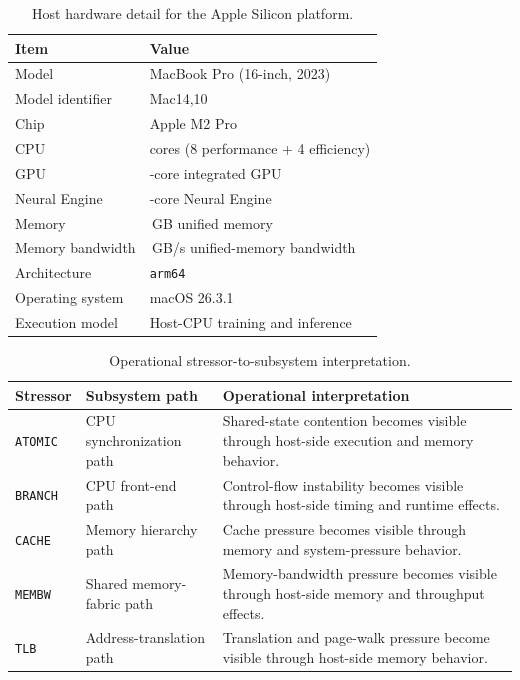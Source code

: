 \begin{table}[!t]
\centering
\caption{Host hardware detail for the Apple Silicon platform.}
\label{tab:app_host_hw}
{\scriptsize
\setlength{\tabcolsep}{2.6pt}
\renewcommand{\arraystretch}{1.02}
\begin{tabularx}{\columnwidth}{@{}l >{\raggedright\arraybackslash}X@{}}
\toprule
Item & Value \\
\midrule
Model & MacBook Pro (16-inch, 2023) \\
Model identifier & Mac14,10 \\
Chip & Apple M2 Pro \\
CPU & 12 cores (8 performance + 4 efficiency) \\
GPU & 19-core integrated GPU \\
Neural Engine & 16-core Neural Engine \\
Memory & 16\,GB unified memory \\
Memory bandwidth & 200\,GB/s unified-memory bandwidth \\
Architecture & \texttt{arm64} \\
Operating system & macOS 26.3.1 \\
Execution model & Host-CPU training and inference \\
\bottomrule
\end{tabularx}
}
\end{table}

\begin{table}[!t]
\centering
\caption{Operational stressor-to-subsystem interpretation.}
\label{tab:app_stressor_map}
{\scriptsize
\setlength{\tabcolsep}{2.2pt}
\renewcommand{\arraystretch}{1.02}
\begin{tabularx}{\columnwidth}{@{}>{\raggedright\arraybackslash}p{}>{\raggedright\arraybackslash}p{}>{\raggedright\arraybackslash}X@{}}
\toprule
Stressor & Subsystem path & Operational interpretation \\
\midrule
\texttt{ATOMIC} & CPU synchronization path & Shared-state contention becomes visible through host-side execution and memory behavior. \\
\texttt{BRANCH} & CPU front-end path & Control-flow instability becomes visible through host-side timing and runtime effects. \\
\texttt{CACHE} & Memory hierarchy path & Cache pressure becomes visible through memory and system-pressure behavior. \\
\texttt{MEMBW} & Shared memory-fabric path & Memory-bandwidth pressure becomes visible through host-side memory and throughput effects. \\
\texttt{TLB} & Address-translation path & Translation and page-walk pressure become visible through host-side memory behavior. \\
\bottomrule
\end{tabularx}
}
\end{table}

